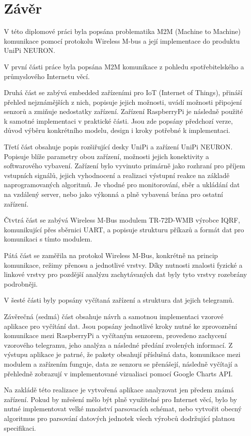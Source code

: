 \chapter{Závěr}

V této diplomové práci byla popsána problematika M2M (Machine to Machine) komunikace pomocí protokolu Wireless M-bus a její implementace do produktu UniPi NEURON.


V první části práce byla popsána M2M komunikace z pohledu spotřebitelského a průmyslového Internetu věcí.

Druhá část se zabývá embedded zařízeními pro IoT (Internet of Things), přináší přehled nejznámějších z nich, popisuje jejich možnosti, uvádí možnosti připojení senzorů a zmiňuje nedostatky zařízení. Zařízení RaspberryPi je následně použité k samotné implementaci v praktické části. Jsou zde popsány předchozí verze, důvod výběru konkrétního modelu, design i kroky potřebné k implementaci.

Třetí část obsahuje popis rozšiřující desky UniPi a zařízení UniPi NEURON. Popisuje blíže parametry obou zařízení, možnosti jejich konektivity a softwarového vybavení. Zařízení bylo vyvinuto primárně jako rozhraní pro příjem vstupních signálů, jejich vyhodnocení a realizaci výstupní reakce na základě naprogramovaných algoritmů. Je vhodné pro monitorování, sběr a ukládání dat na vzdálený server, nebo jako výkonná a plně vybavená brána pro ostatní zařízení.

Čtvtrá část se zabývá Wireless M-Bus modulem TR-72D-WMB výrobce IQRF, komunikující přes sběrnici UART, a popisuje strukturu příkazů a formát dat pro komunikaci s tímto modulem.

Pátá část se zaměřila na protokol Wireless M-Bus, konkrétně na princip komunikace, režimy přenosu a jednotlivé vrstvy. 
Díky nutnosti znalosti fyzické a linkové vrstvy pro pozdější analýzu zachytávaných dat byly tyto vrstvy rozebrány podrobněji. 

V šesté části byly popsány vyčítaná zařízení a struktura dat jejich telegramů.

Závěrečná (sedmá) část obsahuje návrh a samotnou implementaci vzorové aplikace pro vyčítání dat. Jsou popsány jednotlivé kroky nutné ke zprovoznění komunikace mezi RaspberryPi a vyčítaným senzorem, provedeno zachycení vzorového telegramu, jeho analýza a následné předání zvolených informací. Z výstupu aplikace je patrné, že pakety obsahují příslušná data, komunikace mezi modulem a zařízením funguje, data ze senzoru se přenášejí, následně vyčítají a přehledně zobrazují v implementované vizualiaci pomocí Google Charts API.

Na zakládě této realizace je vytvořená aplikace analyzovat jen předem známá zařízení. Pokud by mřešení mělo být plně využitelné pro Internet věcí, bylo by nutné implementovat velké množství parsovacích schémat, nebo vytvořit obecný algoritmus pro parsování datových jednotek všech výrobců dodržující platnou specifikaci.


